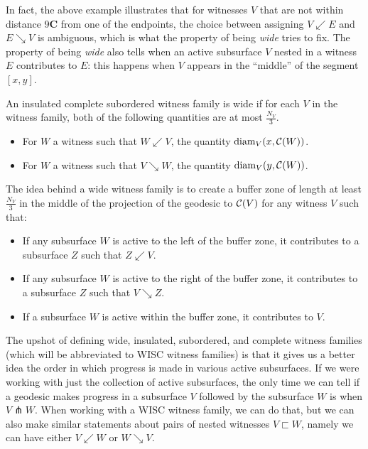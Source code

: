   In fact, the above example illustrates that for witnesses $V$ that are not within distance $9 \mathbf{C}$ from one of the endpoints, the choice between assigning $V \swarrow E$ and $E \searrow V$ is ambiguous, which is what the property of being \emph{wide} tries to fix.
  The property of being \emph{wide} also tells when an active subsurface $V$ nested in a witness $E$ contributes to $E$: this happens when $V$ appears in the ``middle'' of the segment $[x,y]$.


  \begin{definition}
    An insulated complete subordered witness family is wide if for each $V$ in the witness family, both of the following quantities are at most $\frac{N_V}{3}$.
    \begin{itemize}
    \item For $W$ a witness such that $W \swarrow V$, the quantity $\mathrm{diam}_V(x, \mathcal{C}(W))$.
    \item For $W$ a witness such that $V \searrow W$, the quantity $\mathrm{diam}_V(y, \mathcal{C}(W))$.
    \end{itemize}
  \end{definition}

  The idea behind a wide witness family is to create a buffer zone of length at least $\frac{N_V}{3}$ in the middle of the projection of the geodesic to $\mathcal{C}(V)$ for any witness $V$ such that:
  \begin{itemize}
  \item If any subsurface $W$ is active to the left of the buffer zone, it contributes to a subsurface $Z$ such that $Z \swarrow V$.
  \item If any subsurface $W$ is active to the right of the buffer zone, it contributes to a subsurface $Z$ such that $V \searrow Z$.
  \item If a subsurface $W$ is active within the buffer zone, it contributes to $V$.
  \end{itemize}

  The upshot of defining wide, insulated, subordered, and complete witness families (which will be abbreviated to WISC witness families) is that it gives us a better idea the order in which progress is made in various active subsurfaces.
  If we were working with just the collection of active subsurfaces, the only time we can tell if a geodesic makes progress in a subsurface $V$ followed by the subsurface $W$ is when $V \pitchfork W$.
  When working with a WISC witness family, we can do that, but we can also make similar statements about pairs of nested witnesses $V \sqsubset W$, namely we can have either $V \swarrow W$ or $W \searrow V$.

